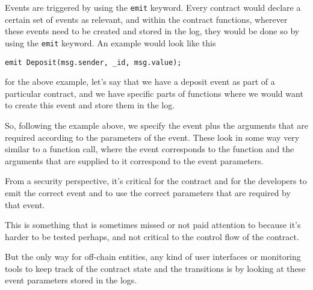 Events are triggered by using the \texttt{emit} keyword. Every contract
would declare a certain set of events as relevant, and within the
contract functions, wherever these events need to be created and stored
in the log, they would be done so by using the \texttt{emit} keyword. An
example would look like this

\begin{lstlisting}[language=Solidity,numbers=none]
emit Deposit(msg.sender, _id, msg.value);
\end{lstlisting}

for the above example, let's say that we have a deposit event as part of
a particular contract, and we have specific parts of functions where we
would want to create this event and store them in the log.

So, following the example above, we specify the event plus the arguments
that are required according to the parameters of the event. These look
in some way very similar to a function call, where the event corresponds
to the function and the arguments that are supplied to it correspond to
the event parameters.

From a security perspective, it's critical for the contract and for the
developers to emit the correct event and to use the correct parameters
that are required by that event.

This is something that is sometimes missed or not paid attention to
because it's harder to be tested perhaps, and not critical to the
control flow of the contract.

But the only way for off-chain entities, any kind of user interfaces or
monitoring tools to keep track of the contract state and the transitions
is by looking at these event parameters stored in the logs.
